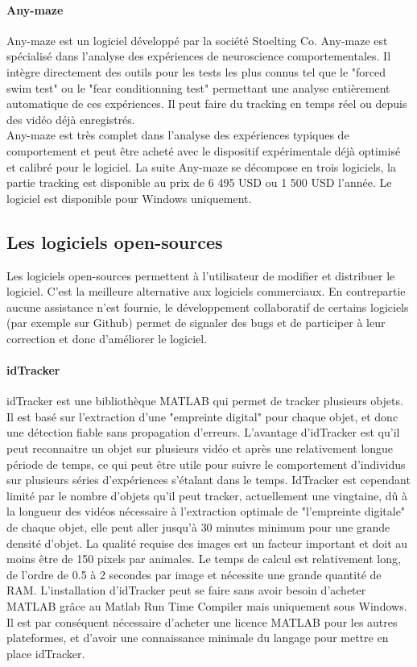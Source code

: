   \paragraph{Any-maze}
  Any-maze est un logiciel développé par la société Stoelting Co. Any-maze est spécialisé dans l'analyse des expériences de neuroscience comportementales. Il intègre directement des outils pour les tests les plus connus tel que le "forced swim test" ou le "fear conditionning test" permettant une analyse entièrement automatique de ces expériences. Il peut faire du tracking en temps réel ou depuis des vidéo déjà enregistrés.\\
  Any-maze est très complet dans l'analyse des expériences typiques de comportement et peut être acheté avec le dispositif expérimentale déjà optimisé et calibré pour le logiciel. La suite Any-maze se décompose en trois logiciels, la partie tracking est disponible au prix de 6 495 USD ou 1 500 USD l'année. Le logiciel est disponible pour Windows uniquement. 

  \subsection{Les logiciels open-sources}
  Les logiciels open-sources permettent à l'utilisateur de modifier et distribuer le logiciel. C'est la meilleure alternative aux logiciels commerciaux. En contrepartie aucune assistance n'est fournie, le développement collaboratif de certains logiciels (par exemple sur Github) permet de signaler des bugs et de participer à leur correction et donc d'améliorer le logiciel.

  \paragraph{idTracker} idTracker \cite{perez2014idtracker} est une bibliothèque MATLAB qui permet de tracker plusieurs objets. Il est basé sur l'extraction d'une "empreinte digital" pour chaque objet, et donc une détection fiable sans propagation d'erreurs. L'avantage d'idTracker est qu'il peut reconnaitre un objet sur plusieurs vidéo et après une relativement longue période de temps, ce qui peut être utile pour suivre le comportement d'individus sur plusieurs séries d'expériences s'étalant dans le temps. IdTracker est cependant limité par le nombre d'objets qu'il peut tracker, actuellement une vingtaine, dû à la longueur des vidéos nécessaire à l'extraction optimale de "l'empreinte digitale" de chaque objet, elle peut aller jusqu'à 30 minutes minimum pour une grande densité d'objet. La qualité requise des images est un facteur important et doit au moins être de 150 pixels par animales. Le temps de calcul est relativement long, de l'ordre de 0.5 à 2 secondes par image et nécessite une grande quantité de RAM. L'installation d'idTracker peut se faire sans avoir besoin d'acheter MATLAB grâce au Matlab Run Time Compiler mais uniquement sous Windows. Il est par conséquent nécessaire d'acheter une licence MATLAB pour les autres plateformes, et d'avoir une connaissance minimale du langage pour mettre en place idTracker.

